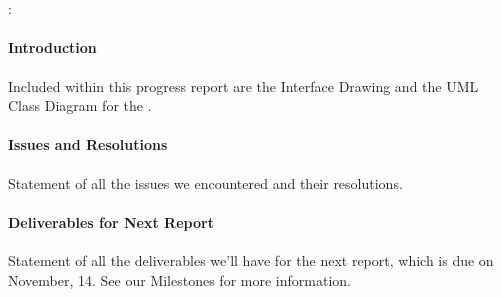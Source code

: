 \documentclass[12pt,oneside]{article}
\begin{document}


\begin{center}
{\large\bf \projectTitle \\ ~\\}
{\teamName: \\\teamMembers}
\end{center}

\doublespace

\paragraph{Introduction}
Included within this progress report are the Interface Drawing and the UML
Class Diagram for the \projectTitle.

\paragraph{Issues and Resolutions}
Statement of all the issues we encountered and their resolutions.

\paragraph{Deliverables for Next Report}
Statement of all the deliverables we'll have for the next report, which is due
on November, 14. See our Milestones for more information.

\singlespace


\end{document}
